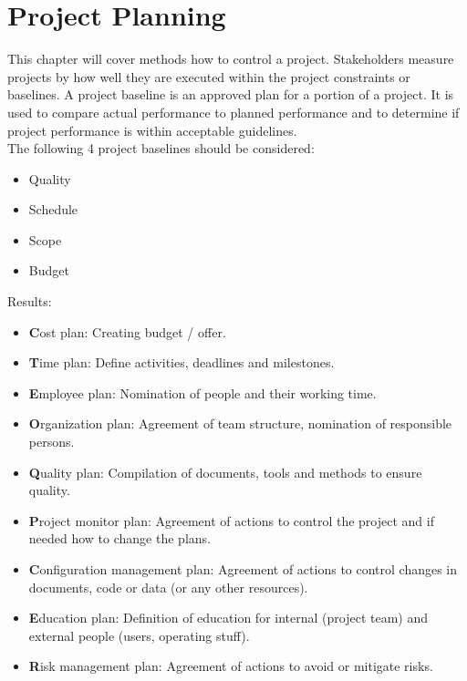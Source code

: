 %
%
\newpage
\chapter{Project Planning}
%
This chapter will cover methods how to control a project. Stakeholders
measure projects by how well they are executed within the project
constraints or baselines. A project baseline is an approved plan for a
portion of a project. It is used to compare actual performance to
planned performance and to determine if project performance is within
acceptable guidelines.\\
The following 4 project baselines should be considered:
\begin{itemize}
\item Quality
\item Schedule
\item Scope
\item Budget
\end{itemize}

Results:
\begin{itemize}
\item {\textbf Cost plan}: Creating budget / offer. %
\item {\textbf Time plan}: Define activities, deadlines and milestones. %
\item {\textbf Employee plan}: Nomination of people and their working time. %
\item {\textbf Organization plan}: Agreement of team structure, nomination of responsible persons. %
\item {\textbf Quality plan}: Compilation of documents, tools and methods to ensure quality. %
\item {\textbf Project monitor plan}: Agreement of actions to control the project and if needed how to change the plans. %
\item {\textbf Configuration management plan}: Agreement of actions to control changes in documents, code or data (or any other resources). %
\item {\textbf Education plan}: Definition of education for internal (project team) and external people (users, operating stuff). %
\item {\textbf Risk management plan}: Agreement of actions to avoid or mitigate risks. %
\end{itemize}
\newpage
